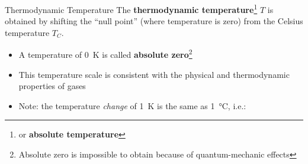 \documentclass[12pt,aspectratio=169]{beamer}
\newcommand{\eq}[2]{\vspace{#1}{\Large\begin{displaymath}#2\end{displaymath}}}
\begin{document}
\begin{frame}{Thermodynamic Temperature}
  The \textbf{thermodynamic temperature}\footnote{or \textbf{absolute
      temperature}} $T$
  is obtained by shifting the ``null point'' (where temperature is zero) from
  the Celsius temperature $T_C$.
  
  \eq{-.2in}{
    \boxed{T = T_C + 273.15}
  }
  \begin{itemize}
  \item\vspace{-.1in}A temperature of \SI{0}{\kelvin} is called
    \textbf{absolute zero}\footnote{Absolute zero is impossible to obtain
      because of quantum-mechanic effects}
  \item This temperature scale is consistent with the physical and
    thermodynamic properties of gases
  \item Note: the temperature \emph{change} of \SI{1}{\kelvin} is the same as
    \SI{1}{\celsius}, i.e.:

    \eq{-.25in}{
      \Delta T=\Delta T_C
    }
  \end{itemize}
  \vspace{.25in}
\end{frame}
  


%
%
\end{document}
